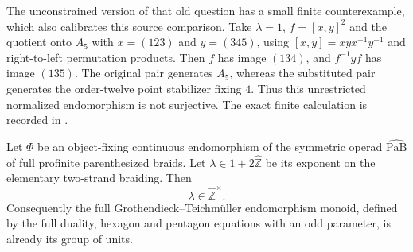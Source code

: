 The unconstrained version of that old question has a small finite
counterexample, which also calibrates this source comparison.
Take $\lambda=1$, $f=[x,y]^2$ and the quotient onto $A_5$ with
$x=(123)$ and $y=(345)$, using $[x,y]=xyx^{-1}y^{-1}$ and
right-to-left permutation products. Then $f$ has image $(134)$,
and $f^{-1}yf$ has image $(135)$. The original pair generates
$A_5$, whereas the substituted pair generates the order-twelve
point stabilizer fixing $4$. Thus this unrestricted normalized
endomorphism is not surjective. The exact finite calculation is
recorded in .

Let $\Phi$ be an object-fixing continuous endomorphism of the symmetric
operad $\widehat{\mathrm{PaB}}$ of full profinite parenthesized braids.
Let $\lambda\in1+2\widehat{\mathbb Z}$ be its exponent on the elementary
two-strand braiding. Then
\[
                         \lambda\in\widehat{\mathbb Z}^{\times}.
\]
Consequently the full Grothendieck--Teichm\"uller endomorphism monoid,
defined by the full duality, hexagon and pentagon equations with an odd
parameter, is already its group of units.

